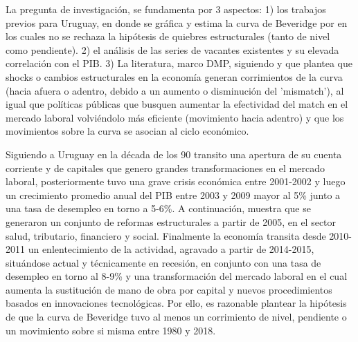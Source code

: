 
La pregunta de investigación, se fundamenta por 3 aspectos: 1) los trabajos previos para Uruguay, en donde se gráfica y estima la curva de Beveridge por \cite{Rama1988, Urrestarazu1997, DECON1993} en los cuales no se rechaza la hipótesis de quiebres estructurales (tanto de nivel como pendiente). 2) el análisis de las series de vacantes existentes y su elevada correlación con el PIB. 3) La literatura, marco DMP, siguiendo \cite{Rodenburg2007} y \cite{Elsby2015} que plantea que shocks o cambios estructurales en la economía generan corrimientos de la curva (hacia afuera o adentro, debido a un aumento o disminución del 'mismatch'), al igual que políticas públicas que busquen aumentar la efectividad del match en el mercado laboral volviéndolo más eficiente (movimiento hacia adentro) y que los movimientos sobre la curva se asocian al ciclo económico. 

Siguiendo a \cite{Antia2001} Uruguay en la década de los 90 transito una apertura de su cuenta corriente y de capitales que genero grandes transformaciones en el mercado laboral, posteriormente tuvo una grave crisis económica entre 2001-2002 y luego un crecimiento promedio anual del PIB entre 2003 y 2009 mayor al 5\% junto a una tasa de desempleo en torno a 5-6\%. A continuación, \cite{Bergara2017} muestra que se generaron un conjunto de reformas estructurales a partir de 2005, en el sector salud, tributario, financiero y social. Finalmente la economía transita desde 2010-2011 un enlentecimiento de la actividad, agravado a partir de 2014-2015, situándose actual y técnicamente en recesión, en conjunto con una tasa de desempleo en torno al 8-9\% y una transformación del mercado laboral en el cual aumenta la sustitución de mano de obra por capital y nuevos procedimientos basados en innovaciones tecnológicas. Por ello, es razonable plantear la hipótesis de que la curva de Beveridge tuvo al menos un corrimiento de nivel, pendiente o un movimiento sobre si misma entre 1980 y 2018. 


